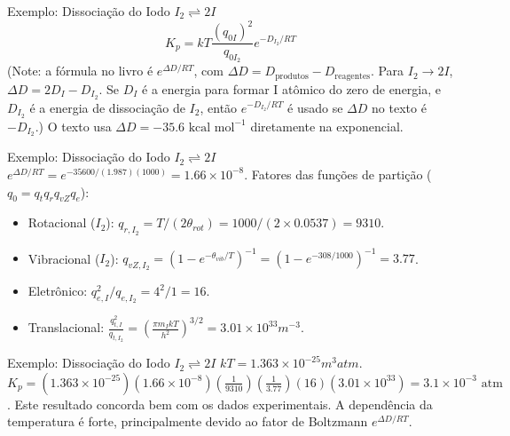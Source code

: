 \documentclass{beamer}
\begin{document}
\begin{frame}{Exemplo: Dissociação do Iodo $I_2 \rightleftharpoons 2I$}
    $$ K_p = kT \frac{(q_{0I})^2}{q_{0I_2}} e^{-D_{I_2}/RT} $$
    (Note: a fórmula no livro é $e^{\Delta D/RT}$, com $\Delta D = D_{\text{produtos}} - D_{\text{reagentes}}$. Para $I_2 \rightarrow 2I$, $\Delta D = 2D_I - D_{I_2}$. Se $D_I$ é a energia para formar I atômico do zero de energia, e $D_{I_2}$ é a energia de dissociação de $I_2$, então $e^{-D_{I_2}/RT}$ é usado se $\Delta D$ no texto é $-D_{I_2}$.) O texto usa $\Delta D = -35.6 \text{ kcal mol}^{-1}$ diretamente na exponencial.

\end{frame}

\begin{frame}{Exemplo: Dissociação do Iodo $I_2 \rightleftharpoons 2I$}
    $e^{\Delta D/RT} = e^{-35600/(1.987)(1000)} = 1.66 \times 10^{-8}$. 
    Fatores das funções de partição ($q_0 = q_t q_r q_{vZ} q_e$):
    \begin{itemize}
        \item Rotacional ($I_2$): $q_{r,I_2} = T/(2\theta_{rot}) = 1000/(2 \times 0.0537) = 9310$.
        \item Vibracional ($I_2$): $q_{vZ,I_2} = (1-e^{-\theta_{vib}/T})^{-1} = (1-e^{-308/1000})^{-1} = 3.77$.
        \item Eletrônico: $q_{e,I}^2/q_{e,I_2} = 4^2/1 = 16$.
        \item Translacional: $\frac{q_{t,I}^2}{q_{t,I_2}} = \left(\frac{\pi m_I kT}{h^2}\right)^{3/2} = 3.01 \times 10^{33} m^{-3}$.
    \end{itemize}
    
\end{frame}

\begin{frame}{Exemplo: Dissociação do Iodo $I_2 \rightleftharpoons 2I$}
    $kT = 1.363 \times 10^{-25} m^3 atm$.
    $K_p = (1.363 \times 10^{-25})(1.66 \times 10^{-8}) \left(\frac{1}{9310}\right) \left(\frac{1}{3.77}\right) (16) (3.01 \times 10^{33}) = 3.1 \times 10^{-3} \text{ atm}$.
    Este resultado concorda bem com os dados experimentais. A dependência da temperatura é forte, principalmente devido ao fator de Boltzmann $e^{\Delta D/RT}$.
\end{frame}
\end{document}
